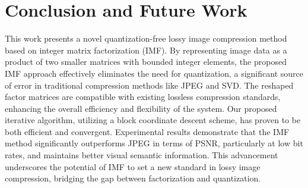 \section{Conclusion and Future Work} \label{sec: conclusion}

This work presents a novel quantization-free lossy image compression method based on integer matrix factorization (IMF). By representing image data as a product of two smaller matrices with bounded integer elements, the proposed IMF approach effectively eliminates the need for quantization, a significant source of error in traditional compression methods like JPEG and SVD. The reshaped factor matrices are compatible with existing lossless compression standards, enhancing the overall efficiency and flexibility of the system. Our proposed iterative algorithm, utilizing a block coordinate descent scheme, has proven to be both efficient and convergent. Experimental results demonstrate that the IMF method significantly outperforms JPEG in terms of PSNR, particularly at low bit rates, and maintains better visual semantic information. This advancement underscores the potential of IMF to set a new standard in lossy image compression, bridging the gap between factorization and quantization.